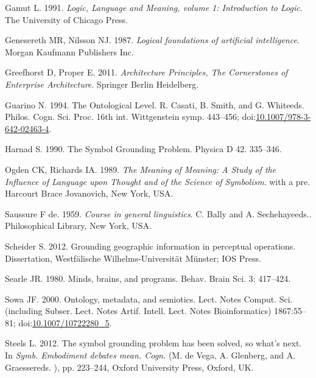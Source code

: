 \documentclass[a4paper,11pt,oneside,oldfontcommands]{memoir}
\theoremstyle{definition}
\theoremstyle{break}		%
\numberwithin{equation}{chapter}
\numberwithin{figure}{chapter}
\begin{document}
\leavevmode\hypertarget{ref-Gamut1991}{}%
Gamut L. 1991. \emph{Logic, Language and Meaning, volume 1: Introduction
to Logic}. The University of Chicago Press.

\leavevmode\hypertarget{ref-Genesereth:1987dg}{}%
Genesereth MR, Nilsson NJ. 1987. \emph{Logical foundations of artificial
intelligence}. Morgan Kaufmann Publishers Inc.

\leavevmode\hypertarget{ref-Greefhorst2011}{}%
Greefhorst D, Proper E. 2011. \emph{Architecture Principles, The
Cornerstones of Enterprise Architecture}. Springer Berlin Heidelberg.

\leavevmode\hypertarget{ref-Guarino1994b}{}%
Guarino N. 1994. The Ontological Level. R. Casati, B. Smith, and G.
Whiteeds. Philos. Cogn. Sci. Proc. 16th int. Wittgenstein symp.
443--456;
doi:\href{https://doi.org/10.1007/978-3-642-02463-4}{10.1007/978-3-642-02463-4}.

\leavevmode\hypertarget{ref-Harnad1990}{}%
Harnad S. 1990. The Symbol Grounding Problem. Physica D 42. 335--346.

\leavevmode\hypertarget{ref-Ogden1989}{}%
Ogden CK, Richards IA. 1989. \emph{The Meaning of Meaning: A Study of
the Influence of Language upon Thought and of the Science of Symbolism}.
with a pre. Harcourt Brace Jovanovich, New York, USA.

\leavevmode\hypertarget{ref-Saussure:1983ka}{}%
Saussure F de. 1959. \emph{Course in general linguistics}. C. Bally and
A. Sechehayeeds.. Philosophical Library, New York, USA.

\leavevmode\hypertarget{ref-Scheider:2012tj}{}%
Scheider S. 2012. Grounding geographic information in perceptual
operations. Dissertation, Westfälische Wilhelms-Universität Münster; IOS
Press.

\leavevmode\hypertarget{ref-Searle:1980hw}{}%
Searle JR. 1980. Minds, brains, and programs. Behav. Brain Sci. 3:
417--424.

\leavevmode\hypertarget{ref-Sowa:2000di}{}%
Sowa JF. 2000. Ontology, metadata, and semiotics. Lect. Notes Comput.
Sci. (including Subser. Lect. Notes Artif. Intell. Lect. Notes
Bioinformatics) 1867:55--81;
doi:\href{https://doi.org/10.1007/10722280_5}{10.1007/10722280\_5}.

\leavevmode\hypertarget{ref-Steels:2008tr}{}%
Steels L. 2012. The symbol grounding problem has been solved, so what's
next. In \emph{Symb. Embodiment debates mean. Cogn.} (M. de Vega, A.
Glenberg, and A. Graessereds. ), pp. 223--244, Oxford University Press,
Oxford, UK.
\end{document}
